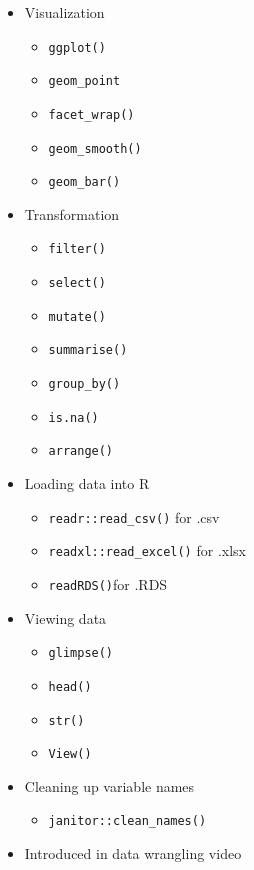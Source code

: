 \documentclass[
  openany]{book}
\providecommand{\tightlist}{%
  \setlength{\itemsep}{0pt}\setlength{\parskip}{0pt}}
\begin{document}
\begin{itemize}
\item
  Visualization~

  \begin{itemize}
  \tightlist
  \item
    \texttt{ggplot()}
  \item
    \texttt{geom\_point}
  \item
    \texttt{facet\_wrap()}
  \item
    \texttt{geom\_smooth()}
  \item
    \texttt{geom\_bar()}
  \end{itemize}
\item
  Transformation

  \begin{itemize}
  \tightlist
  \item
    \texttt{filter()}
  \item
    \texttt{select()}
  \item
    \texttt{mutate()}
  \item
    \texttt{summarise()}
  \item
    \texttt{group\_by()}
  \item
    \texttt{is.na()}
  \item
    \texttt{arrange()}
  \end{itemize}
\item
  Loading data into R

  \begin{itemize}
  \tightlist
  \item
    \texttt{readr::read\_csv()} for .csv
  \item
    \texttt{readxl::read\_excel()} for .xlsx
  \item
    \texttt{readRDS()}for .RDS
  \end{itemize}
\item
  Viewing data

  \begin{itemize}
  \tightlist
  \item
    \texttt{glimpse()}
  \item
    \texttt{head()}
  \item
    \texttt{str()}
  \item
    \texttt{View()}
  \end{itemize}
\item
  Cleaning up variable names

  \begin{itemize}
  \tightlist
  \item
    \texttt{janitor::clean\_names()}
  \end{itemize}
\item
  Introduced in data wrangling video


\end{itemize}
\end{document}
